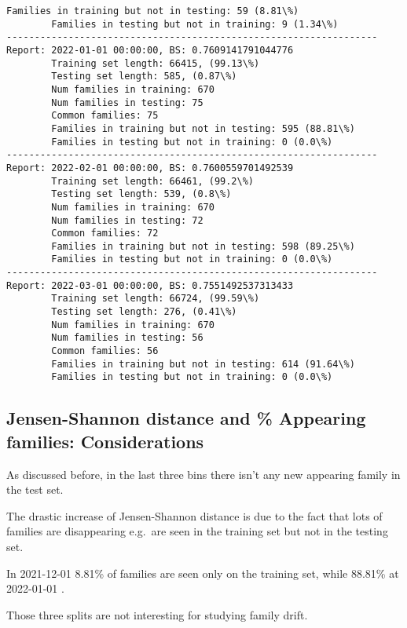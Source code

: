 \documentclass[11pt]{article}
\begin{document}
\begin{Verbatim}[commandchars=\\\{\}]
        Families in training but not in testing: 59 (8.81\%)
        Families in testing but not in training: 9 (1.34\%)
------------------------------------------------------------------
Report: 2022-01-01 00:00:00, BS: 0.7609141791044776
        Training set length: 66415, (99.13\%)
        Testing set length: 585, (0.87\%)
        Num families in training: 670
        Num families in testing: 75
        Common families: 75
        Families in training but not in testing: 595 (88.81\%)
        Families in testing but not in training: 0 (0.0\%)
------------------------------------------------------------------
Report: 2022-02-01 00:00:00, BS: 0.7600559701492539
        Training set length: 66461, (99.2\%)
        Testing set length: 539, (0.8\%)
        Num families in training: 670
        Num families in testing: 72
        Common families: 72
        Families in training but not in testing: 598 (89.25\%)
        Families in testing but not in training: 0 (0.0\%)
------------------------------------------------------------------
Report: 2022-03-01 00:00:00, BS: 0.7551492537313433
        Training set length: 66724, (99.59\%)
        Testing set length: 276, (0.41\%)
        Num families in training: 670
        Num families in testing: 56
        Common families: 56
        Families in training but not in testing: 614 (91.64\%)
        Families in testing but not in training: 0 (0.0\%)
    \end{Verbatim}

    \hypertarget{jensen-shannon-distance-and-appearing-families-considerations}{%
\subsection{Jensen-Shannon distance and \% Appearing families:
Considerations}\label{jensen-shannon-distance-and-appearing-families-considerations}}

As discussed before, in the last three bins there isn't any new
appearing family in the test set.

The drastic increase of Jensen-Shannon distance is due to the fact that
lots of families are disappearing e.g.~are seen in the training set but
not in the testing set.

In 2021-12-01 8.81\% of families are seen only on the training set,
while 88.81\% at 2022-01-01 .

Those three splits are not interesting for studying family drift.
\end{document}
